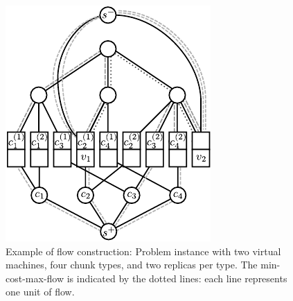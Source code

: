 \documentclass[9pt]{sigcomm-alternate}
\begin{document}
\begin{figure}
\includegraphics[width=\columnwidth]{figs/flow_ma_cv}
\caption{Example of flow construction: Problem instance with two virtual machines, four chunk
types, and two replicas per type. The min-cost-max-flow
is indicated by the dotted lines: each line represents one unit of flow.}
\label{fig:flow_construction}
\end{figure}
\end{document}
